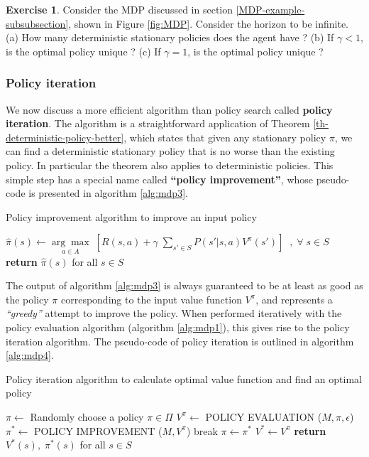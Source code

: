 \documentclass{article}
\theoremstyle{definition}
\newtheorem{exercise}{Exercise}[section]
\theoremstyle{remark}
\begin{document}
\begin{exercise}
Consider the MDP discussed in section \ref{MDP-example-subsubsection}, shown in Figure \ref{fig:MDP}. Consider the horizon to be infinite. (a) How many deterministic stationary policies does the agent have ? (b) If $\gamma < 1$, is the optimal policy unique ? (c) If $\gamma = 1$, is the optimal policy unique ?
\label{ex-number-policies}
\end{exercise}

\subsubsection{Policy iteration}
We now discuss a more efficient algorithm than policy search called \textbf{policy iteration}. The algorithm is a straightforward application of Theorem \ref{th-deterministic-policy-better}, which states that given any stationary policy $\pi$, we can find a deterministic stationary policy that is no worse than the existing policy. In particular the theorem also applies to deterministic policies. This simple step has a special name called \textbf{``policy improvement''}, whose pseudo-code is presented in algorithm \ref{alg:mdp3}.

\begin{algorithm}
\caption{Policy improvement algorithm to improve an input policy}\label{alg:mdp3}
\begin{algorithmic}[1]
\State $\hat{\pi}(s) \gets \underset{a \in A}{\arg\max} \; \left[ R(s,a) + \gamma \; \sum_{s' \in S} P(s'|s,a) V^{\pi}(s') \right] \;\;,\; \forall \; s \in S$
\label{mdp3label}
\State \textbf{return} $\hat{\pi}(s)$ for all $s \in S$
\EndProcedure
\end{algorithmic}
\end{algorithm}

The output of algorithm \ref{alg:mdp3} is always guaranteed to be at least as good as the policy $\pi$ corresponding to the input value function $V^{\pi}$, and represents a \textit{``greedy''} attempt to improve the policy. When performed iteratively with the policy evaluation algorithm (algorithm \ref{alg:mdp1}), this gives rise to the policy iteration algorithm. The pseudo-code of policy iteration is outlined in algorithm \ref{alg:mdp4}.

\begin{algorithm}
\caption{Policy iteration algorithm to calculate optimal value function and find an optimal policy}\label{alg:mdp4}
\begin{algorithmic}[1]
\State $\pi \gets $ Randomly choose a policy $\pi \in \Pi$
\State $V^{\pi} \gets$ \small POLICY EVALUATION \normalsize ($M,\pi,\epsilon$)
\State $\pi^{\ast} \gets$ \small POLICY IMPROVEMENT \normalsize ($M,V^{\pi}$)
\State break
\Else
\State $\pi \gets \pi^{\ast}$
\EndIf
\EndWhile
\label{mdp4label}
\State $V^{\ast} \gets V^{\pi}$
\State \textbf{return} $V^{\ast}(s), \; \pi^{\ast}(s)$ for all $s \in S$
\EndProcedure
\end{algorithmic}
\end{algorithm}
\end{document}
